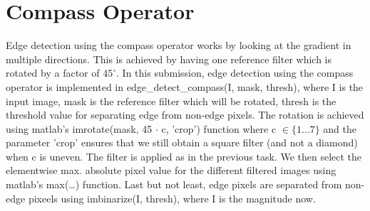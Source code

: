 \documentclass{article}
\begin{document}
\section{Compass Operator}
Edge detection using the compass operator works by looking at the gradient in multiple directions. This is achieved by having one reference filter which is rotated by a factor of $45 ^ \circ$. In this submission, edge detection using the compass operator is implemented in \textsf{edge\_detect\_compass(I, mask, thresh)}, where \textsf{I} is the input image, \textsf{mask} is the reference filter which will be rotated, \textsf{thresh} is the threshold value for separating edge from non-edge pixels. The rotation is achieved using matlab's \textsf{ imrotate(mask, 45 $\cdot$ c, 'crop')} function where \textsf{c} $\in \{ 1 \dots 7 \}$ and the parameter \textsf{'crop'} ensures that we still obtain a square filter (and not a diamond) when \textsf{c} is uneven. The filter is applied as in the previous task. We then select the elementwise max. absolute pixel value for the different filtered images using matlab's \textsf{max(\dots)} function. Last but not least, edge pixels are separated from non-edge pixeels using \textsf{imbinarize(I, thresh)}, where \textsf{I} is the magnitude now.
\end{document}
